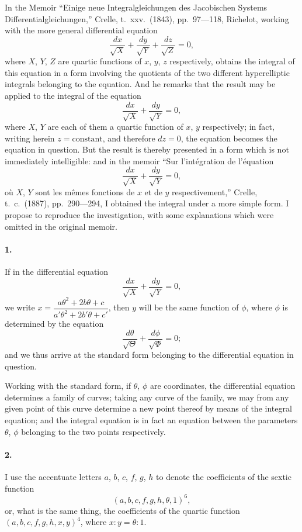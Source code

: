 \documentclass[11pt,a4paper]{book}
\providecommand{\between}{,}
\begin{document}
{{{In the Memoir ``Einige neue Integralgleichungen des Jacobischen Systems Differentialgleichungen,'' Crelle, t.~xxv.~(1843), pp.~97---118, Richelot, working with the more general differential equation
\[
\frac{dx}{\sqrt{X}} + \frac{dy}{\sqrt{Y}} + \frac{dz}{\sqrt{Z}} = 0,
\]
where $X$, $Y$, $Z$ are quartic functions of $x$, $y$, $z$ respectively, obtains the integral of this equation in a form involving the quotients of the two different hyperelliptic integrals belonging to the equation. And he remarks that the result may be applied to the integral of the equation
\[
\frac{dx}{\sqrt{X}} + \frac{dy}{\sqrt{Y}} = 0,
\]
where $X$, $Y$ are each of them a quartic function of $x$, $y$ respectively; in fact, writing herein $z = \text{constant}$, and therefore $dz = 0$, the equation becomes the equation in question. But the result is thereby presented in a form which is not immediately intelligible: and in the memoir ``Sur l'int\'egration de l'\'equation
\[
\frac{dx}{\sqrt{X}} + \frac{dy}{\sqrt{Y}} = 0,
\]
o\`u $X$, $Y$ sont les m\^emes fonctions de $x$ et de $y$ respectivement,'' Crelle, t.~c.~(1887), pp.~290---294, I obtained the integral under a more simple form. I propose to reproduce the investigation, with some explanations which were omitted in the original memoir.

\paragraph{1.} If in the differential equation
\[
\frac{dx}{\sqrt{X}} + \frac{dy}{\sqrt{Y}} = 0,
\]
we write $x = \dfrac{a\theta^2 + 2b\theta + c}{a'\theta^2 + 2b'\theta + c'}$, then $y$ will be the same function of $\phi$, where $\phi$ is determined by the equation
\[
\frac{d\theta}{\sqrt{\Theta}} + \frac{d\phi}{\sqrt{\Phi}} = 0;
\]
and we thus arrive at the standard form belonging to the differential equation in question.

Working with the standard form, if $\theta$, $\phi$ are coordinates, the differential equation determines a family of curves; taking any curve of the family, we may from any given point of this curve determine a new point thereof by means of the integral equation; and the integral equation is in fact an equation between the parameters $\theta$, $\phi$ belonging to the two points respectively.

\paragraph{2.} I use the accentuate letters $a$, $b$, $c$, $f$, $g$, $h$ to denote the coefficients of the sextic function
\[
(a, b, c, f, g, h\between\theta, 1)^6,
\]
or, what is the same thing, the coefficients of the quartic function $(a, b, c, f, g, h\between x, y)^4$, where $x : y = \theta : 1$.

}}}
\end{document}
